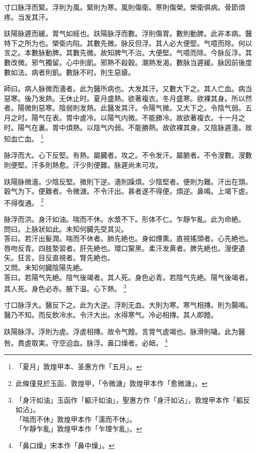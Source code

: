 \documentclass[b5paper,twoside,zihao=-4,UTF8]{ctexbook}
\begin{document}
寸口脉浮而緊。浮則为風。緊則为寒。風則傷衛。寒則傷榮。榮衛俱病。骨節煩疼。当发其汗。

趺陽脉遲而緩。胃气如經也。趺陽脉浮而數。浮則傷胃。數則動脾。此非本病。醫特下之所为也。榮衛内陷。其數先微。脉反但浮。其人必大便堅。气噫而除。何以言之。本數脉動脾。其數先微。故知脾气不治。大便堅。气噫而除。今脉反浮。其數改微。邪气獨留。心中則飢。邪熱不殺穀。潮熱发渴。數脉当遲緩。脉因前後度數如法。病者則飢。數脉不时。則生惡瘡。

師曰。病人脉微而濇者。此为醫所病也。大发其汗。又數大下之。其人亡血。病当惡寒。後乃发熱。无休止时。夏月盛熱。欲著複衣。冬月盛寒。欲裸其身。所以然者。陽微則惡寒。陰弱則发熱。此醫发其汗。令陽气微。又大下之。令陰气弱。五月之时。陽气在表。胃中虗冷。以陽气内微。不能勝冷。故欲著複衣。十一月之时。陽气在裏。胃中煩熱。以陰气内弱。不能勝熱。故欲裸其身。又陰脉遲濇。故知血亡血。
	\footnote{「夏月」敦煌甲本、圣惠方作「五月」。}

脉浮而大。心下反堅。有熱。屬臓者。攻之。不令发汗。屬腑者。不令溲數。溲數則便堅。汗多則熱愈。汗少則便難。脉遲尚未可攻。

趺陽脉微濇。少陰反堅。微則下逆。濇則躁煩。少陰堅者。便則为難。汗出在頭。穀气为下。便難者。令微溏。不令汗出。甚者遂不得便。煩逆。鼻鳴。上竭下虗。不得復通。
	\footnote{此條僅見於玉函、敦煌甲，「令微溏」敦煌甲本作「愈微溏」。}

脉浮而洪。身汗如油。喘而不休。水漿不下。形体不仁。乍靜乍亂。此为命絶。\\
問曰。上脉狀如此。未知何臓先受其災。\\
答曰。若汗出髮潤。喘而不休者。肺先絶也。身如煙熏。直視搖頭者。心先絶也。唇吻反青。四肢漐習者。肝先絶也。環口黧黑。柔汗发黄者。脾先絶也。溲便遺矢。狂言。目反直視者。腎先絶也。\\
又問。未知何臓陰陽先絶。\\
答曰。若陽气先絶。陰气後竭者。其人死。身色必青。若陰气先絶。陽气後竭者。其人死。身色必赤。腋下温。心下熱。
	\footnote{「身汗如油」玉函作「軀汗如油」，聖惠方作「身汗如沾」，敦煌甲本作「軀反如沾」。\\「喘而不休」敦煌甲本作「濡而不休」。\\「乍靜乍亂」敦煌甲本作「乍理乍亂」。}

寸口脉浮大。醫反下之。此为大逆。浮則无血。大則为寒。寒气相摶。則为腸鳴。醫乃不知。而反飲冷水。令汗大出。水得寒气。冷必相摶。其人即饐。

趺陽脉浮。浮則为虗。浮虗相摶。故令气饐。言胃气虗竭也。脉滑則噦。此为醫咎。責虗取実。守空迫血。脉浮。鼻口燥者。必衄。
	\footnote{「鼻口燥」宋本作「鼻中燥」。}
\end{document}
